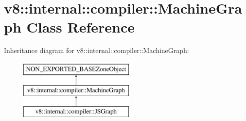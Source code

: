 \hypertarget{classv8_1_1internal_1_1compiler_1_1MachineGraph}{}\section{v8\+:\+:internal\+:\+:compiler\+:\+:Machine\+Graph Class Reference}
\label{classv8_1_1internal_1_1compiler_1_1MachineGraph}
Inheritance diagram for v8\+:\+:internal\+:\+:compiler\+:\+:Machine\+Graph\+:\begin{figure}[H]
\begin{center}
\leavevmode
\includegraphics[height=3.000000cm]{classv8_1_1internal_1_1compiler_1_1MachineGraph}
\end{center}
\end{figure}
